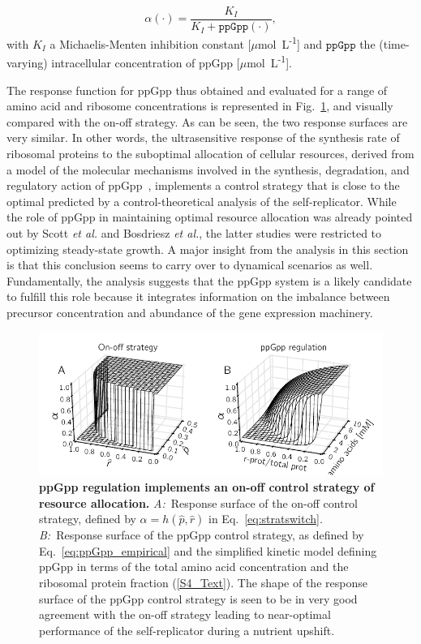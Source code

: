 \begin{equation}
\alpha(\cdot) = \frac{K_I}{K_I + \texttt{ppGpp}(\cdot)},
\label{eq:ppGpp_empirical}
\end{equation}
with $K_I$ a Michaelis-Menten inhibition constant [$\mu$mol~L\textsuperscript{-1}] and $\texttt{ppGpp}$ the (time-varying) intracellular concentration of ppGpp [$\mu$mol~L\textsuperscript{-1}].

The response function for ppGpp thus obtained and evaluated for a range of amino acid and ribosome concentrations is represented in Fig.~\ref{fig:ppGppsurface}, and visually compared with the on-off strategy.
As can be seen, the two response surfaces are very similar.
In other words, the ultrasensitive response of the synthesis rate of ribosomal proteins to the suboptimal allocation of cellular resources, derived from a model of the molecular mechanisms involved in the synthesis, degradation, and regulatory action of ppGpp~\cite{bosdriesz_how_2015}, implements a control strategy that is close to the optimal predicted by a control-theoretical analysis of the self-replicator.
While the role of ppGpp in maintaining optimal resource allocation was already pointed out by Scott \textit{et al.} and Bosdriesz \textit{et al.}, the latter studies were restricted to optimizing steady-state growth.
A major insight from the analysis in this section is that this conclusion seems to carry over to dynamical scenarios as well.
Fundamentally, the analysis suggests that the ppGpp system is a likely candidate to fulfill this role because it integrates information on the imbalance between precursor concentration and abundance of the gene expression machinery.

\begin{figure}[tb]
\centering
\includegraphics[scale=1]{./Fig/Fig8}
\caption{
\textbf{ppGpp regulation implements an on-off control strategy of resource allocation.}
\textit{A:}~Response surface of the on-off control strategy, defined by $\alpha = h(\hat{p},\hat{r})$ in Eq.~\ref{eq:stratswitch}.
\textit{B:}~Response surface of the ppGpp control strategy, as defined by Eq.~\ref{eq:ppGpp_empirical} and the simplified kinetic model defining ppGpp in terms of the total amino acid concentration and the ribosomal protein fraction (\ref{S4_Text}).
The shape of the response surface of the ppGpp control strategy is seen to be in very good agreement with the on-off strategy leading to near-optimal performance of the self-replicator during a nutrient upshift.
}
\label{fig:ppGppsurface}
\end{figure}


